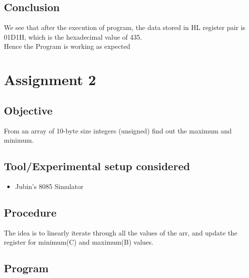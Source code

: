 \documentclass[a4paper]{article} %
\begin{document}
    \subsection{Conclusion}
        We see that after the execution of program, the data stored in HL register pair is 01D1H, which is the hexadecimal value of 435.\\
        Hence the Program is working as expected
\newpage

\section[Find minimum and maximum number in 10-byte unsigned array]{Assignment 2} %
    \subsection{Objective}
        From an array of 10-byte size integers (unsigned) find out the maximum and minimum.
    \subsection{Tool/Experimental setup considered}
        \begin{itemize}
            \item Jubin's 8085 Simulator
        \end{itemize}
    \subsection{Procedure}
        The idea is to linearly iterate through all the values of the arr, and update the register for minimum(C) and maximum(B) values.
    \subsection{Program}
        
\end{document}
